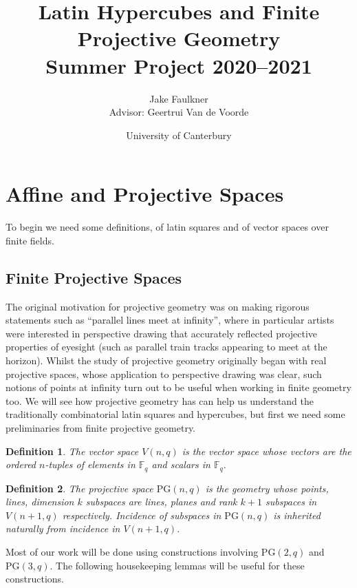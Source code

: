 \documentclass{article}
\title{{\Huge Latin Hypercubes and Finite Projective Geometry} \\
  Summer Project 2020--2021}
\author{Jake Faulkner \\
  Advisor: Geertrui Van de Voorde}
\date{University of Canterbury}
\newtheorem{definition}{Definition}
\newcommand{\PG}{\mathrm{PG}}
\begin{document}
\maketitle
\pagebreak
\section{Affine and Projective Spaces}
To begin we need some definitions, of latin squares and of vector spaces over finite fields.

\subsection{Finite Projective Spaces}

The original motivation for projective geometry was on making rigorous
statements such as “parallel lines meet at infinity”, where in particular artists were interested in perspective drawing that accurately reflected projective properties of eyesight (such as parallel train tracks appearing to meet at the horizon).
Whilst the study of projective geometry originally
began with real projective spaces, whose application to perspective drawing was
clear, such notions of points at infinity turn out to be useful when working in
finite geometry too. We will see how projective geometry has can help us understand the
traditionally combinatorial latin squares and hypercubes, but first we need some
preliminaries from finite projective geometry.

\begin{definition}
  The vector space \(V(n, q)\) is the vector space whose vectors are the ordered \(n\)-tuples of elements in \(\mathbb{F}_q\) and scalars in \(\mathbb{F}_q\).
\end{definition}

\begin{definition}
  The projective space \(\PG(n, q)\) is the geometry whose points, lines, dimension \(k\) subspaces are lines, planes and rank \(k + 1\) subspaces in \(V(n + 1, q)\) respectively. Incidence of subspaces in \(\PG(n, q)\) is inherited naturally from incidence in \(V(n + 1, q)\).
\end{definition}

Most of our work will be done using constructions involving \(\PG(2, q)\) and \(\PG(3, q)\). The following housekeeping lemmas will be useful for these constructions.
\end{document}
